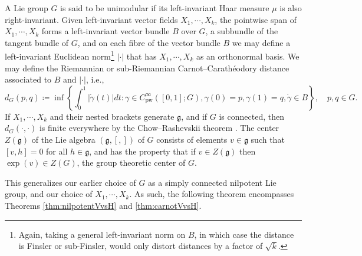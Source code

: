 \documentclass[11pt,reqno]{amsart}
\newcommand{\1}{\mathbf 1}
\begin{document}
A Lie group $G$ is said to be unimodular if its left-invariant Haar measure $\mu$ is also right-invariant. Given left-invariant vector fields $X_1,\cdots,X_k$, the pointwise span of $X_1,\cdots,X_k$ forms a left-invariant vector bundle $B$ over $G$, a subbundle of the tangent bundle of $G$, and on each fibre of the vector  bundle $B$ we may define a left-invariant Euclidean norm\footnote{Again, taking a general left-invariant norm on $B$, in which case the distance is Finsler or sub-Finsler, would only distort distances by a factor of $\sqrt{k}$.} $\left|\cdot \right|$ that has $X_1,\cdots,X_k$ as an orthonormal basis. We may define the Riemannian or sub-Riemannian Carnot--Carath\'eodory distance associated to $B$ and $\left|\cdot \right|$, i.e.,
\[
d_G\left(p,q\right)\coloneqq \inf\left\{\int_0^1 \left|\dot{\gamma}\left(t\right) \right|dt : \gamma\in C_{\mathrm{pw}}^\infty \left(\left[0,1\right];G\right),\gamma\left(0\right)=p,\gamma\left(1\right)=q,\dot{\gamma}\in B \right\},\quad p,q\in G.
\]
If $X_1,\cdots,X_k$ and their nested brackets generate $\mathfrak{g}$, and if $G$ is connected, then $d_G\left(\cdot,\cdot\right)$ is finite everywhere by the Chow--Rashevskii theorem \cite{chow1940systeme,rashevskii1938connecting}. The center $Z\left(\mathfrak{g}\right)$ of the Lie algebra $\left(\mathfrak{g},\left[,\right]\right)$ of $G$ consists of elements $v\in \mathfrak{g}$ such that $\left[v,h\right]=0$ for all $h\in \mathfrak{g}$, and has the property that if $v\in Z\left(\mathfrak{g}\right)$ then $\exp\left(v\right)\in Z\left(G\right)$, the group theoretic center of $G$.

This generalizes our earlier choice of $G$ as a simply connected nilpotent Lie group, and our choice of $X_1,\cdots,X_k$. As such, the following theorem encompasses Theorems \ref{thm:nilpotentVvsH} and \ref{thm:carnotVvsH}.
\end{document}
